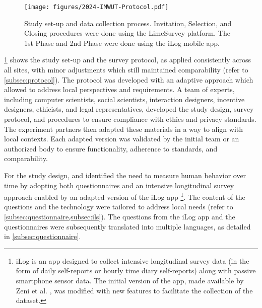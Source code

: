 \begin{figure}[!hbt]
    \texttt{[image: figures/2024-IMWUT-Protocol.pdf]}
    \caption{Study set-up and data collection process. Invitation, Selection, and Closing procedures were done using the LimeSurvey platform. The 1st Phase and 2nd Phase were done using the iLog mobile app.}
    \label{fig:ExpPhasesDetailed}
\end{figure}
\noindent
\cref{fig:ExpPhasesDetailed} shows the study set-up and the survey protocol, as applied consistently across all sites, with minor adjustments which still maintained comparability (refer to \cref{subsec:protocol}). The protocol was developed with an adaptive approach which allowed to address local perspectives and requirements. A team of experts, including computer scientists, social scientists, interaction designers, incentive designers, ethicists, and legal representatives, developed the study design, survey protocol, and procedures to ensure compliance with ethics and privacy standards. The experiment partners then adapted these materials in a way to align with local contexts. Each adapted version was validated by the initial team or an authorized body to ensure functionality, adherence to standards, and comparability.

For the study design, \UNITN and \LSE identified the need to measure human behavior over time by adopting both questionnaires and an intensive longitudinal survey approach \cite{iida2023using, mcneish2021measurement} enabled by an adapted version of the iLog app \cite{2014-PERCOM}\footnote{iLog is an app designed to collect intensive longitudinal survey data (in the form of daily self-reports or hourly time diary self-reports) along with passive smartphone sensor data. The initial version of the app, made available by Zeni et al. \cite{2020-zeni1,2014-PERCOM}, was modified with new features to facilitate the collection of the \dataset dataset.}. The content of the questions and the technology were tailored to address local needs (refer to \cref{subsec:questionnaire,subsec:ils}). The questions from the iLog app and the questionnaires were subsequently translated into multiple languages, as detailed in \cref{subsec:questionnaire}. 


